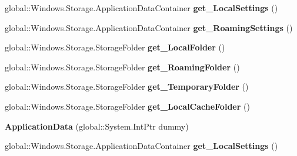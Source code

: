 \begin{DoxyCompactItemize}
\mbox{\label{class_windows_1_1_storage_1_1_application_data_aa776fab90569a200a9729b7a18d9f4aa}} 
global\+::\+Windows.\+Storage.\+Application\+Data\+Container {\bfseries get\+\_\+\+Local\+Settings} ()
\item 
\mbox{\label{class_windows_1_1_storage_1_1_application_data_a27e78d63f97516acd70935e1472a8c98}} 
global\+::\+Windows.\+Storage.\+Application\+Data\+Container {\bfseries get\+\_\+\+Roaming\+Settings} ()
\item 
\mbox{\label{class_windows_1_1_storage_1_1_application_data_a4be66d1c6f347f25204f30fba6f63485}} 
global\+::\+Windows.\+Storage.\+Storage\+Folder {\bfseries get\+\_\+\+Local\+Folder} ()
\item 
\mbox{\label{class_windows_1_1_storage_1_1_application_data_a195408f98de3b9e189bb12ea66880cb6}} 
global\+::\+Windows.\+Storage.\+Storage\+Folder {\bfseries get\+\_\+\+Roaming\+Folder} ()
\item 
\mbox{\label{class_windows_1_1_storage_1_1_application_data_a3f3b3cf88635a6774215a68677f6e5a7}} 
global\+::\+Windows.\+Storage.\+Storage\+Folder {\bfseries get\+\_\+\+Temporary\+Folder} ()
\item 
\mbox{\label{class_windows_1_1_storage_1_1_application_data_a1f35e4887e3eb7dd667bf1900f0371ce}} 
global\+::\+Windows.\+Storage.\+Storage\+Folder {\bfseries get\+\_\+\+Local\+Cache\+Folder} ()
\item 
\mbox{\label{class_windows_1_1_storage_1_1_application_data_a870285ae522d1069764e2fec1208bffb}} 
{\bfseries Application\+Data} (global\+::\+System.\+Int\+Ptr dummy)
\item 
\mbox{\label{class_windows_1_1_storage_1_1_application_data_aa776fab90569a200a9729b7a18d9f4aa}} 
global\+::\+Windows.\+Storage.\+Application\+Data\+Container {\bfseries get\+\_\+\+Local\+Settings} ()

\end{DoxyCompactItemize}
